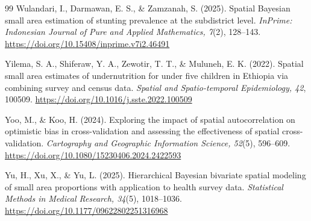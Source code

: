 \documentclass[12pt,a4paper]{article}
\theoremstyle{definition}
\theoremstyle{remark}
\begin{document}
\begin{sloppypar}
\begin{thebibliography}{99}
Wulandari, I., Darmawan, E. S., \& Zamzanah, S. (2025). Spatial Bayesian small area estimation of
stunting prevalence at the subdistrict level. \emph{InPrime: Indonesian Journal of Pure and Applied
Mathematics, 7}(2), 128--143. \url{https://doi.org/10.15408/inprime.v7i2.46491}

Yilema, S. A., Shiferaw, Y. A., Zewotir, T. T., \& Muluneh, E. K. (2022). Spatial small area
estimates of undernutrition for under five children in Ethiopia via combining survey and census data.
\emph{Spatial and Spatio-temporal Epidemiology, 42}, 100509.
\url{https://doi.org/10.1016/j.sste.2022.100509}

Yoo, M., \& Koo, H. (2024). Exploring the impact of spatial autocorrelation on optimistic bias in
cross-validation and assessing the effectiveness of spatial cross-validation. \emph{Cartography and
Geographic Information Science, 52}(5), 596--609. \url{https://doi.org/10.1080/15230406.2024.2422593}

Yu, H., Xu, X., \& Yu, L. (2025). Hierarchical Bayesian bivariate spatial modeling of small area
proportions with application to health survey data. \emph{Statistical Methods in Medical Research,
34}(5), 1018--1036. \url{https://doi.org/10.1177/09622802251316968}
\end{thebibliography}
\end{sloppypar}
\end{document}
